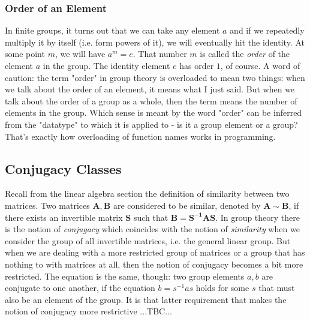 










\subsubsection{Order of an Element}
In finite groups, it turns out that we can take any element $a$ and if we repeatedly multiply it by itself (i.e. form powers of it), we will eventually hit the identity. At some point $m$, we will have $a^m = e$. That number $m$ is called the \emph{order} of the element $a$ in the group. The identity element $e$ has order $1$, of course. A word of caution: the term "order" in group theory is overloaded to mean two things: when we talk about the order of an element, it means what I just said. But when we talk about the order of a group as a whole, then the term means the number of elements in the group. Which sense is meant by the word "order" can be inferred from the "datatype" to which it is applied to - is it a group element or a group? That's exactly how overloading of function names works in programming. 

\subsection{Conjugacy Classes}
Recall from the linear algebra section the definition of similarity between two matrices. Two matrices $\mathbf{A,B}$ are considered to be similar, denoted by $\mathbf{A} \sim \mathbf{B}$, if there exists an invertible matrix $\mathbf{S}$ such that $\mathbf{B} = \mathbf{S^{-1} A S}$. In group theory there is the notion of \emph{conjugacy} which coincides with the notion of \emph{similarity} when we consider the group of all invertible matrices, i.e. the general linear group. But when we are dealing with a more restricted group of matrices or a group that has nothing to with matrices at all, then the notion of conjugacy becomes a bit more restricted. The equation is the same, though: two group elements $a,b$ are conjugate to one another, if the equation $b = s^{-1} a s$ holds for some $s$ that must also be an element of the group. It is that latter requirement that makes the notion of conjugacy more restrictive ...TBC...

